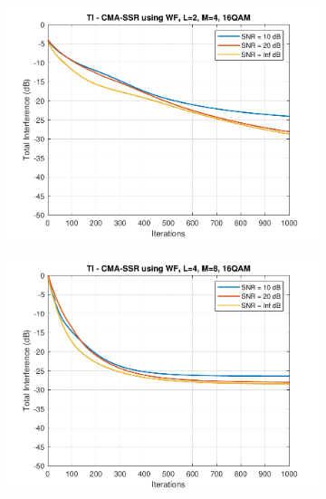 \begin{figure}
\begin{subfigure}[b]{0.45\textwidth}
		\includegraphics[width=\linewidth]{./figs/BF_WF_TI_16QAM_L=2_M=4_K=1000.pdf}
		\label{fig:wf_ti16_24}
	\end{subfigure}
	\begin{subfigure}[b]{0.45\textwidth}
		\includegraphics[width=\linewidth]{./figs/BF_WF_TI_16QAM_L=4_M=8_K=1000.pdf}
		\label{fig:wf_ti16_48}
	\end{subfigure}
	\begin{subfigure}[b]{0.45\textwidth}

\end{subfigure}
\end{figure}
